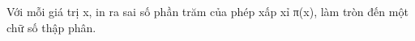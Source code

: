 Với mỗi giá trị x, in ra sai số phần trăm của phép xấp xỉ π(x), làm tròn đến một chữ số thập phân.  

\